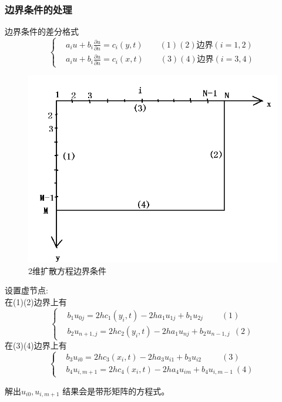 \documentclass[twoside,twocolumn]{article}
\begin{document}
\begin{CJK*}{UTF8}{gkai}
\subsubsection{边界条件的处理}
边界条件的差分格式\\
\begin{equation*}
\left\{
\begin{aligned}
&a_{i}u+b_{i}\frac{\partial u}{\partial n}=c_{i}(y,t)\qquad (1)(2)\text{边界}(i=1,2)\\
&a_{i}u+b_{i}\frac{\partial u}{\partial n}=c_{i}(x,t)\qquad (3)(4)\text{边界}(i=3,4)
\end{aligned}
\right.
\end{equation*}
\begin{figure}[h]
	\centering
	\includegraphics[width=0.6\linewidth]{figure/fig3}
	\caption{2维扩散方程边界条件}
	\label{fig:fig3}
\end{figure}

设置虚节点:\\
在(1)(2)边界上有
\begin{equation*}
\left\{
\begin{aligned}
&b_{1}u_{0j}=2hc_{1}(y_{i},t)-2ha_{1}u_{1j}+b_{1}u_{2j}~~~~~~~~~~(1)\\
&b_{2}u_{n+1,j}=2hc_{2}(y_{i},t)-2ha_{1}u_{nj}+b_{2}u_{n-1,j}~~(2)
\end{aligned}
\right.
\end{equation*}
在(3)(4)边界上有
\begin{equation*}
\left\{
\begin{aligned}
&b_{3}u_{i0}=2hc_{3}(x_{i},t)-2ha_{3}u_{i1}+b_{3}u_{i2}~~~~~~~~~~~(3)\\
&b_{4}u_{i,m+1}=2hc_{4}(x_{i},t)-2ha_{4}u_{im}+b_{4}u_{i,m-1}~(4)
\end{aligned}
\right.
\end{equation*}

解出$u_{i0},u_{i,m+1}$
结果会是带形矩阵的方程式。

\end{CJK*}
\end{document}
